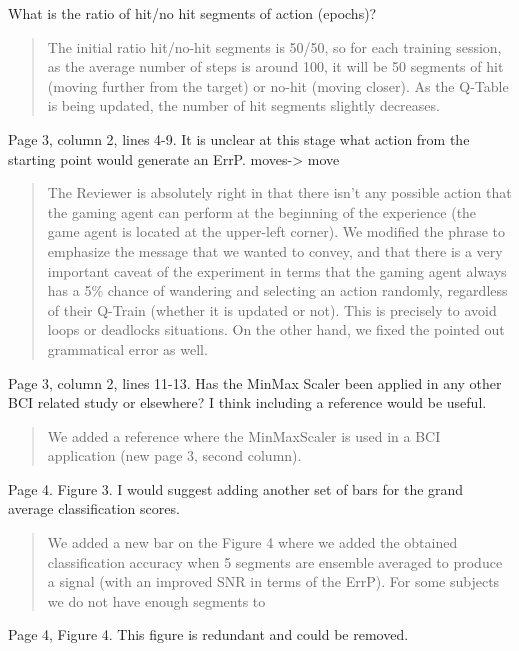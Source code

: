 \documentclass[journal,onecolumn,12pt]{IEEEtran}
\begin{document}
What is the ratio of hit/no hit segments of action (epochs)?


\begin{quotation}
{\color{blue}
The initial ratio hit/no-hit segments is 50/50, so for each training session, as the average number of steps is around 100, it will be 50 segments of hit (moving further from the target) or no-hit (moving closer).  As the Q-Table is being updated, the number of hit segments slightly decreases.
}
\end{quotation}


Page 3, column 2, lines 4-9. It is unclear at this stage what action from the starting point would generate an ErrP.
moves-> move

\begin{quotation}
{\color{blue}
The Reviewer is absolutely right in that there isn't any possible action that the gaming agent can perform at the beginning of the experience (the game agent is located at the upper-left corner).  We modified the phrase to emphasize the message that we wanted to convey, and that there is a very important caveat of the experiment in terms that the gaming agent always has a 5\% chance of wandering and selecting an action randomly, regardless of their Q-Train (whether it is updated or not).  This is precisely to avoid loops or deadlocks situations.
On the other hand, we fixed the pointed out grammatical error as well.
}
\end{quotation}


Page 3, column 2, lines 11-13. Has the MinMax Scaler been applied in any other BCI related study or elsewhere? I think including a reference would be useful.

\begin{quotation}
{\color{blue}
We added a reference where the MinMaxScaler is used in a BCI application (new page 3, second column).
}
\end{quotation}

Page 4. Figure 3. I would suggest adding another set of bars for the grand average classification scores.

\begin{quotation}
{\color{blue}
We added a new bar on the Figure 4 where we added the obtained classification accuracy when 5 segments are ensemble averaged to produce a signal (with an improved SNR in terms of the ErrP).  For some subjects we do not have enough segments to 
}
\end{quotation}

Page 4, Figure 4. This figure is redundant and could be removed.
\end{document}
